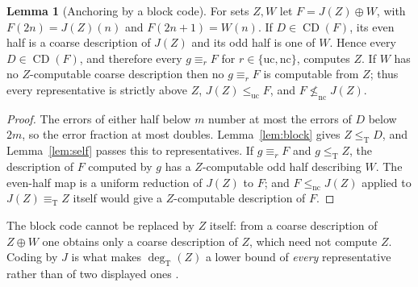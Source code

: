 \documentclass[11pt,letterpaper]{article}
\theoremstyle{definition}
\newtheorem{lemma}[definition]{Lemma}
\numberwithin{equation}{section}
\newcommand{\leT}{\le_{\mathrm T}}
\newcommand{\eqT}{\equiv_{\mathrm T}}
\newcommand{\lenc}{\le_{\mathrm{nc}}}
\newcommand{\leuc}{\le_{\mathrm{uc}}}
\newcommand{\nc}{\mathrm{nc}}
\newcommand{\uc}{\mathrm{uc}}
\newcommand{\CD}{\operatorname{CD}}
\newcommand{\degT}{\deg_{\mathrm T}}
\newcommand{\J}{J}
\newcommand{\src}[1]{\leavevmode{\sffamily\footnotesize\color{Steel}[#1]}}
\begin{document}
\begin{lemma}[Anchoring by a block code]\label{lem:anchor}\src{R2, R5, R7, R8, R9}
For sets $Z,W$ let $F=\J(Z)\oplus W$, with $F(2n)=\J(Z)(n)$ and $F(2n+1)=W(n)$. If $D\in\CD(F)$, its even half is a coarse description of $\J(Z)$ and its odd half is one of $W$. Hence every $D\in\CD(F)$, and therefore every $g\equiv_rF$ for $r\in\{\uc,\nc\}$, computes $Z$. If $W$ has no $Z$-computable coarse description then no $g\equiv_rF$ is computable from $Z$; thus every representative is strictly above $Z$, $\J(Z)\leuc F$, and $F\not\lenc\J(Z)$.
\end{lemma}
\begin{proof}
The errors of either half below $m$ number at most the errors of $D$ below $2m$, so the error fraction at most doubles. Lemma~\ref{lem:block} gives $Z\leT D$, and Lemma~\ref{lem:self} passes this to representatives. If $g\equiv_rF$ and $g\leT Z$, the description of $F$ computed by $g$ has a $Z$-computable odd half describing $W$. The even-half map is a uniform reduction of $\J(Z)$ to $F$; and $F\lenc\J(Z)$ applied to $\J(Z)\eqT Z$ itself would give a $Z$-computable description of $F$.
\end{proof}
The block code cannot be replaced by $Z$ itself: from a coarse description of $Z\oplus W$ one obtains only a coarse description of $Z$, which need not compute $Z$. Coding by $\J$ is what makes $\degT(Z)$ a lower bound of \emph{every} representative rather than of two displayed ones \src{R7}.
\end{document}
